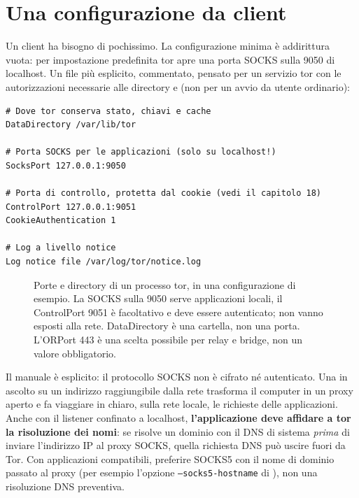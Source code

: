 \section{Una configurazione da client}\label{sec:torrc-client}

Un client ha bisogno di pochissimo. La configurazione minima è addirittura vuota: per impostazione predefinita tor apre una porta SOCKS sulla 9050 di localhost. Un file più esplicito, commentato, pensato per un servizio tor con le autorizzazioni necessarie alle directory  e  (non per un avvio da utente ordinario):
\begin{lstlisting}[language=torrc]
# Dove tor conserva stato, chiavi e cache
DataDirectory /var/lib/tor

# Porta SOCKS per le applicazioni (solo su localhost!)
SocksPort 127.0.0.1:9050

# Porta di controllo, protetta dal cookie (vedi il capitolo 18)
ControlPort 127.0.0.1:9051
CookieAuthentication 1

# Log a livello notice
Log notice file /var/log/tor/notice.log
\end{lstlisting}

\begin{figure}[htbp]
\centering

\caption{Porte e directory di un processo tor, in una configurazione di esempio. La SOCKS sulla 9050 serve applicazioni locali, il ControlPort 9051 è facoltativo e deve essere autenticato; non vanno esposti alla rete. DataDirectory è una cartella, non una porta. L'ORPort 443 è una scelta possibile per relay e bridge, non un valore obbligatorio.}
\label{fig:porte}
\end{figure}

\begin{attenzione}
Il manuale è esplicito: il protocollo SOCKS non è cifrato né autenticato. Una  in ascolto su un indirizzo raggiungibile dalla rete trasforma il computer in un proxy aperto e fa viaggiare in chiaro, sulla rete locale, le richieste delle applicazioni. Anche con il listener confinato a localhost, \textbf{l'applicazione deve affidare a tor la risoluzione dei nomi}: se risolve un dominio con il DNS di sistema \emph{prima} di inviare l'indirizzo IP al proxy SOCKS, quella richiesta DNS può uscire fuori da Tor. Con applicazioni compatibili, preferire SOCKS5 con il nome di dominio passato al proxy (per esempio l'opzione \texttt{--socks5-hostname} di ), non una risoluzione DNS preventiva.
\end{attenzione}

